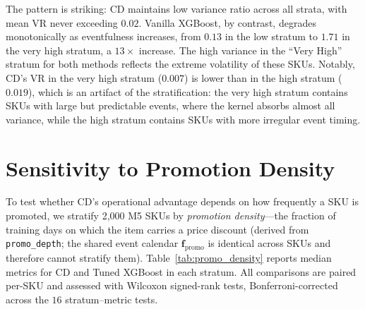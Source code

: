 \documentclass[10pt]{article} %
\theoremstyle{plain}
\theoremstyle{definition}
\begin{document}
The pattern is striking: CD maintains low variance ratio across all strata, with mean VR never exceeding $0.02$. Vanilla XGBoost, by contrast, degrades monotonically as eventfulness increases, from $0.13$ in the low stratum to $1.71$ in the very high stratum, a $13\times$ increase. The high variance in the ``Very High'' stratum for both methods reflects the extreme volatility of these SKUs. Notably, CD's VR in the very high stratum ($0.007$) is lower than in the high stratum ($0.019$), which is an artifact of the stratification: the very high stratum contains SKUs with large but predictable events, where the kernel absorbs almost all variance, while the high stratum contains SKUs with more irregular event timing.

\section{Sensitivity to Promotion Density}
\label{app:promo_density}

To test whether CD's operational advantage depends on how frequently a SKU is promoted, we stratify 2{,}000 M5 SKUs by \emph{promotion density}---the fraction of training days on which the item carries a price discount (derived from \texttt{promo\_depth}; the shared event calendar $\mathbf{f}_{\text{promo}}$ is identical across SKUs and therefore cannot stratify them). Table~\ref{tab:promo_density} reports median metrics for CD and Tuned XGBoost in each stratum. All comparisons are paired per-SKU and assessed with Wilcoxon signed-rank tests, Bonferroni-corrected across the $16$ stratum--metric tests.

\begin{table}[ht]
\centering
\footnotesize
\setlength{\tabcolsep}{3pt}
\caption{Sensitivity to Promotion Density (M5, 2{,}000 SKUs; median VR and wMAPE, plus paired per-SKU win-rates for CD vs.\ Tuned XGBoost). SKUs are split into equal-count tertiles by promotion density (fraction of training days carrying a price discount). ``CD wins'' is the fraction of SKUs on which CD attains the lower metric; at $n\approx650$ per stratum every win-rate above is far beyond chance.}
\label{tab:promo_density}
\end{table}
\end{document}
